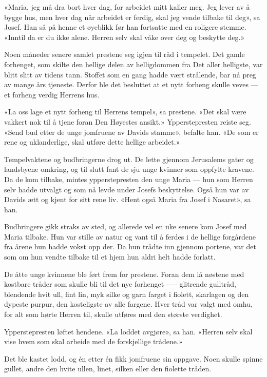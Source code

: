 «Maria, jeg må  dra bort hver dag,
for arbeidet mitt kaller meg. Jeg lever av å bygge hus,
men hver dag når arbeidet er ferdig,
skal jeg vende tilbake til deg», sa Josef.
Han så på henne et øyeblikk før han fortsatte med en roligere stemme.
«Inntil da er du ikke alene. Herren selv skal våke over deg og beskytte deg.»

Noen måneder senere samlet prestene seg igjen til råd i tempelet.
Det gamle forhenget, som skilte den hellige delen av helligdommen fra
Det aller helligste, var blitt slitt av tidens tann.
Stoffet som en gang hadde vært strålende, bar nå preg av mange års
tjeneste. Derfor ble det besluttet at et nytt forheng skulle veves ---
et forheng verdig Herrens hus.

«La oss lage et nytt forheng til Herrens tempel», sa prestene.
«Det skal være vakkert nok til å tjene foran Den Høyestes ansikt.»
Ypperstepresten reiste seg.
«Send bud etter de unge jomfruene av Davids stamme», befalte han.
«De som er rene og uklanderlige, skal utføre dette hellige arbeidet.»

Tempelvaktene og budbringerne drog ut.
De lette gjennom Jerusalems gater og landsbyene omkring, og
til slutt fant de sju unge kvinner som oppfylte kravene.
Da de kom tilbake, mintes ypperstepresten den unge Maria ---
hun som Herren selv hadde utvalgt og som nå levde under Josefs beskyttelse.
Også hun var av Davids ætt og kjent for sitt rene liv.
«Hent også Maria fra Josef i Nasaret»,  sa han.

Budbringere gikk straks av sted, og allerede vel en uke senere
kom Josef med Maria tilbake.
Hun var stille av natur og vant til å ferdes i de
hellige forgårdene fra årene hun hadde vokst opp der.
Da hun trådte inn gjennom portene, var det som om
hun vendte tilbake til et hjem hun aldri helt hadde forlatt.

De åtte unge kvinnene ble ført frem for prestene.
Foran dem lå nøstene med kostbare tråder som skulle bli til det nye
forhenget –--- glitrende gulltråd, blendende hvit ull, fint lin,
myk silke og garn farget i fiolett, skarlagen og den dypeste purpur,
den kosteligste av alle fargene. Hver tråd var valgt med omhu,
for alt som hørte Herren til, skulle utføres med den største verdighet.

Ypperstepresten løftet hendene.
«La loddet avgjøre», sa han. «Herren selv skal vise hvem
som skal arbeide med de forskjellige trådene.»

Det ble kastet lodd, og én etter én fikk jomfruene sin oppgave.
Noen skulle spinne gullet, andre den hvite ullen,
linet, silken eller den fiolette tråden.

